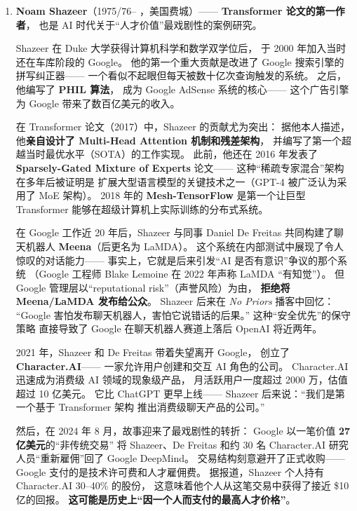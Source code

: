\begin{enumerate}[noitemsep]

\item \textbf{Noam Shazeer}（1975/76-- ，美国费城）——
      \textbf{Transformer 论文的第一作者}，
      也是 AI 时代关于``人才价值''最戏剧性的案例研究。

      Shazeer 在 Duke 大学获得计算机科学和数学双学位后，
      于 2000 年加入当时还在车库阶段的 Google。
      他的第一个重大贡献是改进了 Google 搜索引擎的拼写纠正器——
      一个看似不起眼但每天被数十亿次查询触发的系统。
      之后，他编写了 \textbf{PHIL 算法}，
      成为 Google AdSense 系统的核心——
      这个广告引擎为 Google 带来了数百亿美元的收入。

      在 Transformer 论文（2017）中，Shazeer 的贡献尤为突出：
      据他本人描述，他\textbf{亲自设计了 Multi-Head Attention 机制和残差架构}，
      并编写了第一个超越当时最优水平（SOTA）的工作实现。
      此前，他还在 2016 年发表了 \textbf{Sparsely-Gated Mixture of Experts} 论文——
      这种``稀疏专家混合''架构在多年后被证明是
      扩展大型语言模型的关键技术之一（GPT-4 被广泛认为采用了 MoE 架构）。
      2018 年的 \textbf{Mesh-TensorFlow} 是第一个让巨型 Transformer
      能够在超级计算机上实际训练的分布式系统。

      \begin{whybox}
      在 Google 工作近 20 年后，Shazeer 与同事 Daniel De Freitas
      共同构建了聊天机器人 \textbf{Meena}（后更名为 LaMDA）。
      这个系统在内部测试中展现了令人惊叹的对话能力——
      事实上，它就是后来引发``AI 是否有意识''争议的那个系统
      （Google 工程师 Blake Lemoine 在 2022 年声称 LaMDA ``有知觉''）。
      但 Google 管理层以``reputational risk''（声誉风险）为由，
      \textbf{拒绝将 Meena/LaMDA 发布给公众}。
      Shazeer 后来在 \textit{No Priors} 播客中回忆：
      ``Google 害怕发布聊天机器人，害怕它说错话的后果。''
      这种``安全优先''的保守策略
      直接导致了 Google 在聊天机器人赛道上落后 OpenAI 将近两年。
      \end{whybox}

      2021 年，Shazeer 和 De Freitas 带着失望离开 Google，
      创立了 \textbf{Character.AI}——
      一家允许用户创建和交互 AI 角色的公司。
      Character.AI 迅速成为消费级 AI 领域的现象级产品，
      月活跃用户一度超过 2000 万，估值超过 10 亿美元。
      它比 ChatGPT 更早上线——
      Shazeer 后来说：``我们是第一个基于 Transformer 架构
      推出消费级聊天产品的公司。''

      然后，在 2024 年 8 月，故事迎来了最戏剧性的转折：
      Google 以一笔价值 \textbf{27 亿美元}的``非传统交易''
      将 Shazeer、De Freitas 和约 30 名 Character.AI 研究人员``重新雇佣''回了 Google DeepMind。
      交易结构刻意避开了正式收购——
      Google 支付的是技术许可费和人才雇佣费。
      据报道，Shazeer 个人持有 Character.AI 30--40\% 的股份，
      这意味着他个人从这笔交易中获得了接近 \$10 亿的回报。
      \textbf{这可能是历史上``因一个人而支付的最高人才价格''}。


\end{enumerate}
